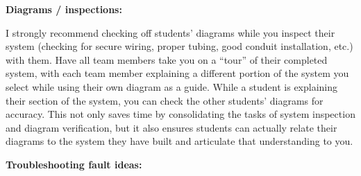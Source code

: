 \begin{itemize}






\noindent
{\bf Diagrams / inspections:}

I strongly recommend checking off students' diagrams while you inspect their system (checking for secure wiring, proper tubing, good conduit installation, etc.) with them.  Have all team members take you on a ``tour'' of their completed system, with each team member explaining a different portion of the system you select while using their own diagram as a guide.  While a student is explaining their section of the system, you can check the other students' diagrams for accuracy.  This not only saves time by consolidating the tasks of system inspection and diagram verification, but it also ensures students can actually relate their diagrams to the system they have built and articulate that understanding to you.

\vskip 10pt

\goodbreak

\noindent
{\bf Troubleshooting fault ideas:}


\end{itemize}
